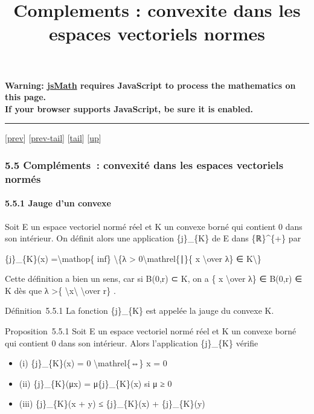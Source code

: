 \documentclass[]{article}
\title{Complements : convexite dans les espaces vectoriels normes}
\author{}
\date{}
\begin{document}
\maketitle

\textbf{Warning: \href{http://www.math.union.edu/locate/jsMath}{jsMath}
requires JavaScript to process the mathematics on this page.\\ If your
browser supports JavaScript, be sure it is enabled.}

\begin{center}\rule{3in}{0.4pt}\end{center}

{[}\href{coursse30.html}{prev}{]}
{[}\href{coursse30.html\#tailcoursse30.html}{prev-tail}{]}
{[}\hyperref[tailcoursse31.html]{tail}{]}
{[}\href{coursch6.html\#coursse31.html}{up}{]}

\subsubsection{5.5 Compléments~: convexité dans les espaces vectoriels
normés}

\paragraph{5.5.1 Jauge d'un convexe}

Soit E un espace vectoriel normé réel et K un convexe borné qui contient
0 dans son intérieur. On définit alors une application \{j\}\_\{K\} de E
dans \{ℝ\}\^{}\{+\} par

\{j\}\_\{K\}(x) =\textbackslash{}mathop\{ inf\} \textbackslash{}\{λ
\textgreater{} 0\textbackslash{}mathrel\{∣\}\{ x \textbackslash{}over
λ\} ∈ K\textbackslash{}\}

Cette définition a bien un sens, car si B(0,r) ⊂ K, on a \{ x
\textbackslash{}over λ\} ∈ B(0,r) ∈ K dès que λ \textgreater{}\{
\textbackslash{}\textbar{}x\textbackslash{}\textbar{}
\textbackslash{}over r\} .

Définition~5.5.1 La fonction \{j\}\_\{K\} est appelée la jauge du
convexe K.

Proposition~5.5.1 Soit E un espace vectoriel normé réel et K un convexe
borné qui contient 0 dans son intérieur. Alors l'application
\{j\}\_\{K\} vérifie

\begin{itemize}
\itemsep1pt\parskip0pt
\item
  (i) \{j\}\_\{K\}(x) = 0 \textbackslash{}mathrel\{⇔\} x = 0
\item
  (ii) \{j\}\_\{K\}(μx) = μ\{j\}\_\{K\}(x) si μ ≥ 0
\item
  (iii) \{j\}\_\{K\}(x + y) ≤ \{j\}\_\{K\}(x) + \{j\}\_\{K\}(y)
\end{itemize}
\end{document}
